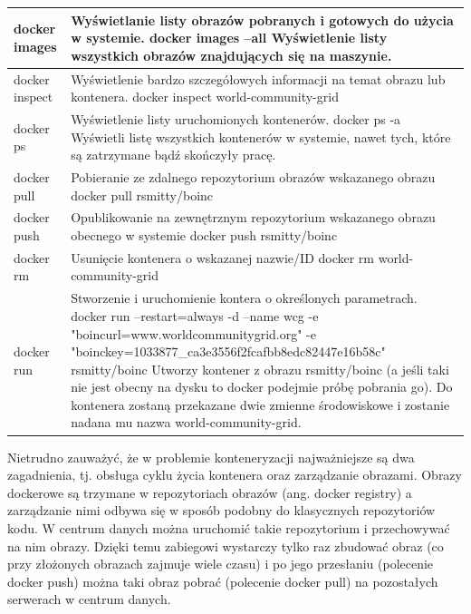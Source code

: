 \documentclass[10pt,a4paper,titlepage,twoside]{report}
\begin{document}
\begin{table}[!htbp]
\begin{tabular}{|p{3cm}|p{11cm}|}
  \hline
  docker images & Wyświetlanie listy obrazów pobranych i gotowych do użycia w systemie. \newline docker images –all \newline Wyświetlenie listy wszystkich obrazów znajdujących się na maszynie. \\
  \hline docker inspect & Wyświetlenie bardzo szczegółowych informacji na temat obrazu lub kontenera. \newline docker inspect  world-community-grid \\
  \hline docker ps & Wyświetlenie listy uruchomionych kontenerów. \newline docker ps -a \newline Wyświetli listę wszystkich kontenerów w systemie, nawet tych, które są zatrzymane bądź skończyły pracę. \\
  \hline docker pull & Pobieranie ze zdalnego repozytorium obrazów wskazanego obrazu \newline docker pull rsmitty/boinc \\
  \hline docker push & Opublikowanie na zewnętrznym repozytorium wskazanego obrazu obecnego w systemie \newline docker push rsmitty/boinc \\
  \hline docker rm & Usunięcie kontenera o wskazanej nazwie/ID \newline docker rm  world-community-grid \\
  \hline docker run & Stworzenie i uruchomienie kontera o określonych parametrach. \newline \newline docker run --restart=always -d --name wcg -e "boincurl=www.worldcommunitygrid.org" -e "boinckey=1033877\_ca3e3556f2fcafbb8edc82447e16b58c" rsmitty/boinc \newline Utworzy kontener z obrazu rsmitty/boinc (a jeśli taki nie jest obecny na dysku to docker podejmie próbę pobrania go). Do kontenera zostaną przekazane dwie zmienne środowiskowe i zostanie nadana mu nazwa world-community-grid.  \\
  \hline
\end{tabular}
\end{table}

 Nietrudno zauważyć, że w problemie konteneryzacji najważniejsze są dwa zagadnienia, tj. obsługa cyklu życia kontenera oraz zarządzanie obrazami. Obrazy dockerowe są trzymane w repozytoriach obrazów (ang. docker registry) a zarządzanie nimi odbywa się w sposób podobny do klasycznych repozytoriów kodu. W centrum danych można uruchomić takie repozytorium i przechowywać na nim obrazy. Dzięki temu zabiegowi wystarczy tylko raz zbudować obraz (co przy złożonych obrazach zajmuje wiele czasu) i po jego przesłaniu (polecenie docker push) można taki obraz pobrać (polecenie docker pull) na pozostałych serwerach w centrum danych.
\end{document}
